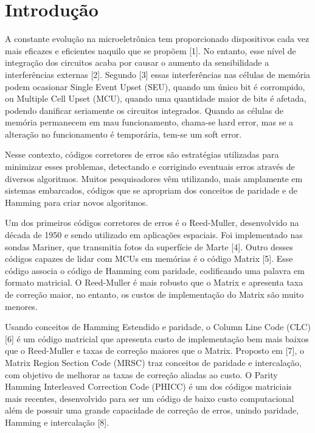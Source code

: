 \chapter{Introdução}\label{CAP1}

A constante evolução na microeletrônica tem proporcionado dispositivos cada vez mais eficazes e eficientes naquilo que se propõem [1]. No entanto, esse nível de integração dos circuitos acaba por causar o aumento da sensibilidade a interferências externas [2]. Segundo [3] essas interferências nas células de memória podem ocasionar Single Event Upset (SEU), quando um único bit é corrompido, ou Multiple Cell Upset (MCU), quando uma quantidade maior de bits é afetada, podendo danificar seriamente os circuitos integrados. Quando as células de memória permanecem em mau funcionamento, chama-se hard error, mas se a alteração no funcionamento é temporária, tem-se um soft error.

Nesse contexto, códigos corretores de erros são estratégias utilizadas para minimizar esses problemas, detectando e corrigindo eventuais erros através de diversos algoritmos. Muitos pesquisadores vêm utilizando, mais amplamente em sistemas embarcados, códigos que se apropriam dos conceitos de paridade e de Hamming para criar novos algoritmos.


Um dos primeiros códigos corretores de erros é o Reed-Muller, desenvolvido na década de 1950 e sendo utilizado em aplicações espaciais. Foi implementado nas sondas Mariner, que transmitia fotos da superfície de Marte [4]. Outro desses códigos capazes de lidar com MCUs em memórias é o código Matrix [5]. Esse código associa o código de Hamming com paridade, codificando uma palavra em formato matricial. O Reed-Muller é mais robusto que o Matrix e apresenta taxa de correção maior, no entanto, os custos de implementação do Matrix são muito menores.

Usando conceitos de Hamming Estendido e paridade, o Column Line Code (CLC) [6] é um código matricial que apresenta custo de implementação bem mais baixos que o Reed-Muller e taxas de correção maiores que o Matrix. Proposto em [7], o Matrix Region Section Code (MRSC) traz conceitos de paridade e intercalação, com objetivo de melhorar as taxas de correção aliadas ao custo. O Parity Hamming Interleaved Correction Code (PHICC) é um dos códigos matriciais mais recentes, desenvolvido para ser um código de baixo custo computacional além de possuir uma grande capacidade de correção de erros, unindo paridade, Hamming e intercalação [8].

